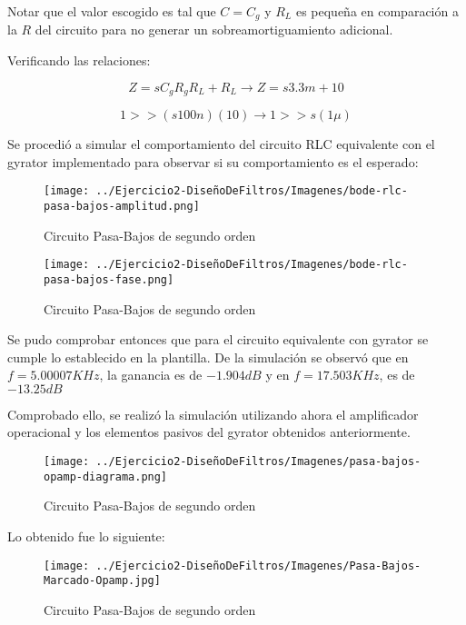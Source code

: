 Notar que el valor escogido es tal que $C=C_g$ y $R_L$ es pequeña en comparación a la $R$ del circuito para no generar
un sobreamortiguamiento adicional.

Verificando las relaciones:

$$Z=sC_gR_gR_L+R_L \longrightarrow Z = s3.3m + 10$$

$$1 >> (s100n)(10) \longrightarrow 1  >> s(1\mu)$$

Se procedió a simular el comportamiento del circuito RLC equivalente con el gyrator implementado para observar si su comportamiento es el esperado:


\begin{figure}[H]
    \centering
    \texttt{[image: ../Ejercicio2-DiseñoDeFiltros/Imagenes/bode-rlc-pasa-bajos-amplitud.png]}
    \caption{Circuito Pasa-Bajos de segundo orden}
\end{figure}

\begin{figure}[H]
    \centering
    \texttt{[image: ../Ejercicio2-DiseñoDeFiltros/Imagenes/bode-rlc-pasa-bajos-fase.png]}
    \caption{Circuito Pasa-Bajos de segundo orden}
\end{figure}

Se pudo comprobar entonces que para el circuito equivalente con gyrator se cumple lo establecido en la plantilla.
De la simulación se observó que en $f=5.00007 KHz$, la ganancia es de $-1.904 dB$ y en $f=17.503KHz$, es de $-13.25 dB$


Comprobado ello, se realizó la simulación utilizando ahora el amplificador operacional y los elementos pasivos del gyrator obtenidos anteriormente.

\begin{figure}[H]
    \centering
    \texttt{[image: ../Ejercicio2-DiseñoDeFiltros/Imagenes/pasa-bajos-opamp-diagrama.png]}
    \caption{Circuito Pasa-Bajos de segundo orden}
\end{figure}

Lo obtenido fue lo siguiente:

\begin{figure}[H]
    \centering
    \texttt{[image: ../Ejercicio2-DiseñoDeFiltros/Imagenes/Pasa-Bajos-Marcado-Opamp.jpg]}
    \caption{Circuito Pasa-Bajos de segundo orden}
\end{figure}

